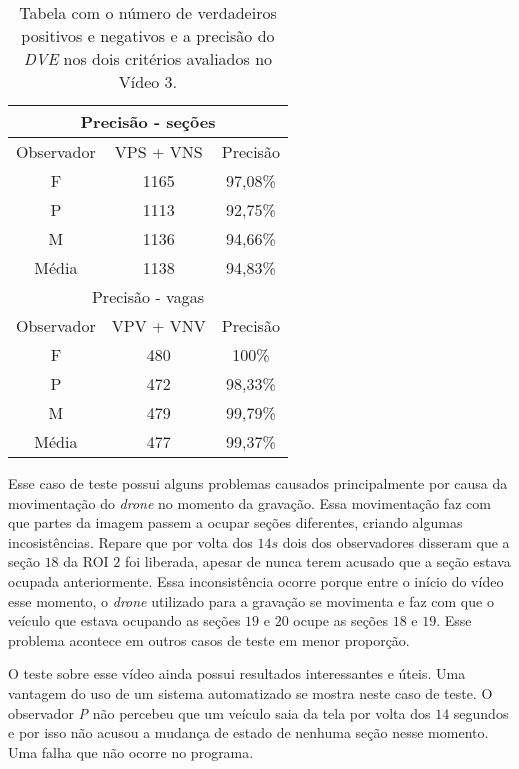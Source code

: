 \begin{table}[H]
\begin{center}
\begin{tabular}{|c||c||c|}
\hline
\multicolumn{3}{|c|}{Precisão - seções}  \\ \hline \hline
Observador & VPS + VNS & Precisão \\ \hline
F & 1165 & 97,08\% \\  \hline
P & 1113 & 92,75\% \\ \hline
M & 1136 & 94,66\% \\ \hline
Média & 1138 & 94,83\% \\
\hline
\hline
\multicolumn{3}{|c|}{Precisão - vagas}  \\ \hline \hline
Observador & VPV + VNV & Precisão \\ \hline
F & 480 & 100\% \\  \hline
P & 472 & 98,33\% \\ \hline
M & 479 & 99,79\% \\ \hline
Média & 477 & 99,37\% \\
\hline
\end{tabular}
\end{center}
\caption{Tabela com o número de verdadeiros positivos e negativos e a precisão do \textit{DVE} nos dois critérios avaliados no Vídeo 3.}
\label{tab:rvideo3}
\end{table}



Esse caso de teste possui alguns problemas causados principalmente por causa da movimentação do \textit{drone} no momento da gravação. Essa movimentação faz com que partes da imagem passem a ocupar seções diferentes, criando algumas incosistências. Repare que por volta dos $14s$ dois dos observadores disseram que a seção $18$ da ROI $2$ foi liberada, apesar de nunca terem acusado que a seção estava ocupada anteriormente. Essa inconsistência ocorre porque entre o início do vídeo esse momento, o \textit{drone} utilizado para a gravação se movimenta e faz com que o veículo que estava ocupando as  seções $19$ e $20$ ocupe as seções $18$ e $19$. Esse problema acontece em outros casos de teste em menor proporção.

O teste sobre esse vídeo ainda possui resultados interessantes e úteis. Uma vantagem do uso de um sistema automatizado se mostra neste caso de teste. O observador \textit{P} não percebeu que um veículo saia da tela por volta dos $14$ segundos e por isso não acusou a mudança de estado de nenhuma seção nesse momento. Uma falha que não ocorre no programa.

